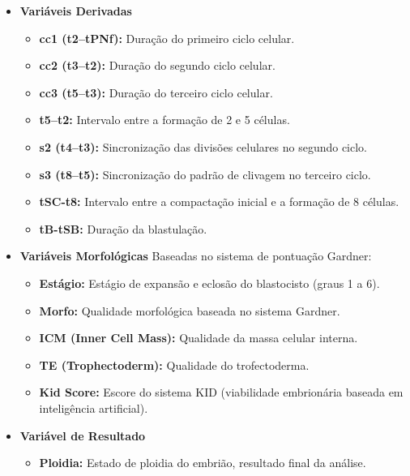 \begin{apendicesenv}
\begin{itemize}
  \item \textbf{Variáveis Derivadas}
  \begin{itemize}
    \item \textbf{cc1 (t2–tPNf):} Duração do primeiro ciclo celular.
    \item \textbf{cc2 (t3–t2):} Duração do segundo ciclo celular.
    \item \textbf{cc3 (t5–t3):} Duração do terceiro ciclo celular.
    \item \textbf{t5–t2:} Intervalo entre a formação de 2 e 5 células.
    \item \textbf{s2 (t4–t3):} Sincronização das divisões celulares no segundo ciclo.
    \item \textbf{s3 (t8–t5):} Sincronização do padrão de clivagem no terceiro ciclo.
    \item \textbf{tSC-t8:} Intervalo entre a compactação inicial e a formação de 8 células.
    \item \textbf{tB-tSB:} Duração da blastulação.
  \end{itemize}
\end{itemize}

\begin{itemize}
  \item \textbf{Variáveis Morfológicas}
  Baseadas no sistema de pontuação Gardner:
  \begin{itemize}
    \item \textbf{Estágio:} Estágio de expansão e eclosão do blastocisto (graus 1 a 6).
    \item \textbf{Morfo:} Qualidade morfológica baseada no sistema Gardner.
    \item \textbf{ICM (Inner Cell Mass):} Qualidade da massa celular interna.
    \item \textbf{TE (Trophectoderm):} Qualidade do trofectoderma.
    \item \textbf{Kid Score:} Escore do sistema KID (viabilidade embrionária baseada em inteligência artificial).
  \end{itemize}
\end{itemize}

\begin{itemize}
  \item \textbf{Variável de Resultado}
  \begin{itemize}
    \item \textbf{Ploidia:} Estado de ploidia do embrião, resultado final da análise.
  \end{itemize}
\end{itemize}



\end{apendicesenv}
